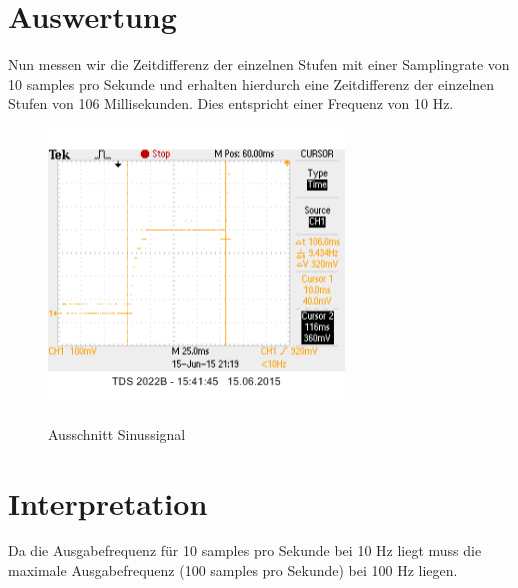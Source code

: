 \documentclass[TGAI_Laborbericht.tex]{subfiles}
\begin{document}
\section{Auswertung}
\label{chap:VERSUCH_3_AUSWERTUNG}
Nun messen wir die Zeitdifferenz der einzelnen Stufen mit einer Samplingrate von 10 samples pro Sekunde und erhalten hierdurch eine Zeitdifferenz der einzelnen Stufen von 106 Millisekunden. Dies entspricht einer Frequenz von 10 Hz.
\begin{figure}[H]
	\includegraphics[width=0.7\textwidth]{media/sinus(10samples).png}
	\label{Hoch}
	\caption{Ausschnitt Sinussignal}
\end{figure}

\section{Interpretation}
\label{chap:VERSUCH_3_INTERPRETATION}
Da die Ausgabefrequenz für 10 samples pro Sekunde bei 10 Hz liegt muss die maximale Ausgabefrequenz (100 samples pro Sekunde) bei 100 Hz liegen.
\end{document}
